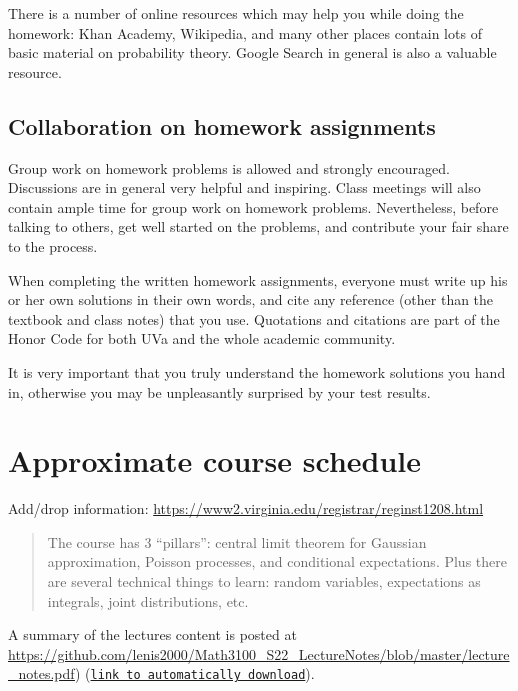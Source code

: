 \documentclass[oneside,11pt]{amsart}
\begin{document}
There is a number of online resources which may help you while doing the homework:
Khan Academy, Wikipedia, and many other 
places contain lots of basic material on probability theory. Google Search
in general
is also a valuable resource.

\subsection{Collaboration on homework assignments}
\label{collaboration}

Group work on homework problems is allowed and strongly encouraged.
Discussions are in general very
helpful and inspiring. Class meetings will also contain ample time
for group work on homework problems.
Nevertheless, before talking to others, get well started
on the problems, and contribute your fair share to the process. 

When completing the written homework assignments, everyone must write up his or her own
solutions in their own words, and cite any reference 
(other than the textbook and
class notes) that you use. Quotations and citations are part of the Honor Code for both UVa
and the whole academic community. 

It is very important that you truly understand the homework solutions you hand
in, otherwise you may be unpleasantly surprised by your test results.

\section{Approximate course schedule}

\noindent Add/drop information: \url{https://www2.virginia.edu/registrar/reginst1208.html}
\bigskip

\begin{quote}
	The course has 3 ``pillars'': central limit theorem for Gaussian approximation, 
	Poisson processes, and conditional expectations. 
	Plus there are several technical things to learn: random variables, expectations as integrals, 
	joint distributions, etc.
\end{quote}

\bigskip

A summary of the lectures content is posted at 
\url{https://github.com/lenis2000/Math3100_S22_LectureNotes/blob/master/lecture_notes.pdf})
(\href{https://raw.githubusercontent.com/lenis2000/Math3100_S22_LectureNotes/master/lecture_notes.pdf}
{\texttt{link to automatically download}}).
\end{document}
